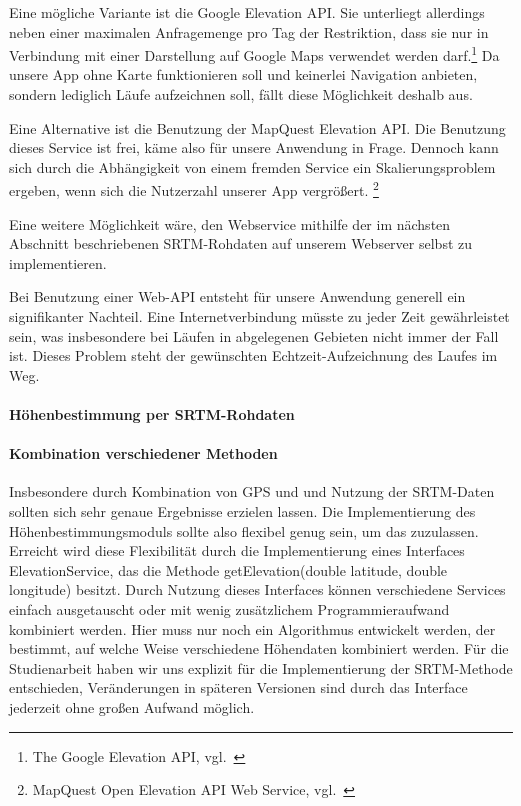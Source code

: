 Eine mögliche Variante ist die Google Elevation API. Sie unterliegt allerdings neben einer maximalen Anfragemenge pro Tag der Restriktion, dass sie nur in Verbindung mit einer Darstellung auf Google Maps verwendet werden darf.\footnote{The Google Elevation API, vgl.~\cite{googleelevation}}  Da unsere App ohne Karte funktionieren soll und keinerlei Navigation anbieten, sondern lediglich Läufe aufzeichnen soll, fällt diese Möglichkeit deshalb aus.

Eine Alternative ist die Benutzung der MapQuest Elevation API. Die Benutzung dieses Service ist frei, käme also für unsere Anwendung in Frage. Dennoch kann sich durch die Abhängigkeit von einem fremden Service ein Skalierungsproblem ergeben, wenn sich die Nutzerzahl unserer App vergrößert. \footnote{MapQuest Open Elevation API Web Service, vgl.~\cite{mapquest}}

Eine weitere Möglichkeit wäre, den Webservice mithilfe der im nächsten Abschnitt beschriebenen SRTM-Rohdaten auf unserem Webserver selbst zu implementieren.

Bei Benutzung einer Web-API entsteht für unsere Anwendung generell ein signifikanter Nachteil. Eine Internetverbindung müsste zu jeder Zeit gewährleistet sein, was insbesondere bei Läufen in abgelegenen Gebieten nicht immer der Fall ist. Dieses Problem steht der gewünschten Echtzeit-Aufzeichnung des Laufes im Weg.
\paragraph{Höhenbestimmung per SRTM-Rohdaten}
\paragraph{Kombination verschiedener Methoden}
Insbesondere durch Kombination von GPS und und Nutzung der SRTM-Daten sollten sich sehr genaue Ergebnisse erzielen lassen. Die Implementierung des Höhenbestimmungsmoduls sollte also flexibel genug sein, um das zuzulassen. Erreicht wird diese Flexibilität durch die Implementierung eines Interfaces ElevationService, das die Methode getElevation(double latitude, double longitude) besitzt. Durch Nutzung dieses Interfaces können verschiedene Services einfach ausgetauscht oder mit wenig zusätzlichem Programmieraufwand kombiniert werden. Hier muss nur noch ein Algorithmus entwickelt werden, der bestimmt, auf welche Weise verschiedene Höhendaten kombiniert werden. Für die Studienarbeit haben wir uns explizit für die Implementierung der SRTM-Methode entschieden, Veränderungen in späteren Versionen sind durch das Interface jederzeit ohne großen Aufwand möglich.
